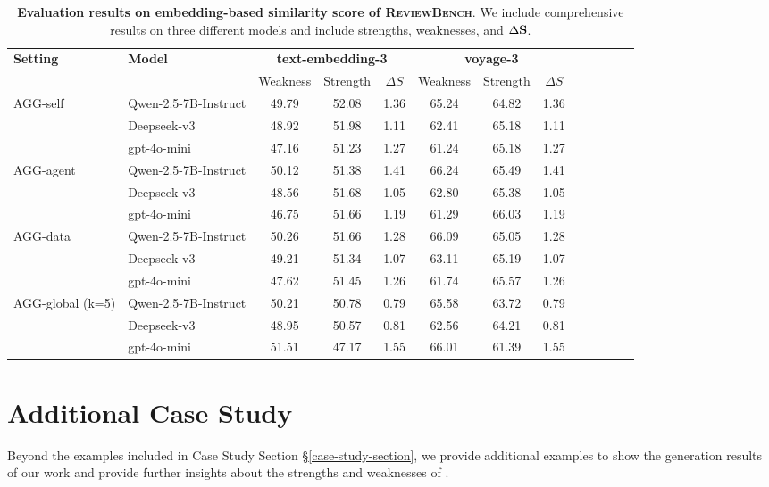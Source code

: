 \begin{table*}[htbp]
\centering
\footnotesize
\renewcommand{\arraystretch}{1.3}
\setlength{\tabcolsep}{3pt}
\caption{\textbf{Evaluation results on embedding-based similarity score of \textsc{ReviewBench}}. We include comprehensive results on three different models and include strengths, weaknesses, and $\Delta \mathbf{S}$.}
\begin{tabular}{llccccccccccc}
\toprule
\multirow{2}{*}{\textbf{Setting}} & \multirow{2}{*}{\textbf{Model}} 
& \multicolumn{3}{c}{\textbf{text-embedding-3}} & \multicolumn{3}{c}{\textbf{voyage-3}} \\
\cmidrule(lr){3-5} \cmidrule(lr){6-8}
 & & Weakness & Strength & $\Delta S$ & Weakness & Strength & $\Delta S$ \\
\midrule
\multirow{3}{*}{AGG-self}
  & Qwen-2.5-7B-Instruct & 49.79 & 52.08 & 1.36 & 65.24 & 64.82 & 1.36 \\
  & Deepseek-v3          & 48.92 & 51.98 & 1.11 & 62.41 & 65.18 & 1.11 \\
  & gpt-4o-mini          & 47.16 & 51.23 & 1.27 & 61.24 & 65.18 & 1.27 \\
\midrule
\multirow{3}{*}{AGG-agent}
  & Qwen-2.5-7B-Instruct & 50.12 & 51.38 & 1.41 & 66.24 & 65.49 & 1.41 \\
  & Deepseek-v3          & 48.56 & 51.68 & 1.05 & 62.80 & 65.38 & 1.05 \\
  & gpt-4o-mini          & 46.75 & 51.66 & 1.19 & 61.29 & 66.03 & 1.19 \\
\midrule
\multirow{3}{*}{AGG-data}
  & Qwen-2.5-7B-Instruct & 50.26 & 51.66 & 1.28 & 66.09 & 65.05 & 1.28 \\
  & Deepseek-v3          & 49.21 & 51.34 & 1.07 & 63.11 & 65.19 & 1.07 \\
  & gpt-4o-mini          & 47.62 & 51.45 & 1.26 & 61.74 & 65.57 & 1.26 \\
\midrule
\multirow{3}{*}{AGG-global (k=5)}
  & Qwen-2.5-7B-Instruct & 50.21 & 50.78 & 0.79 & 65.58 & 63.72 & 0.79 \\
  & Deepseek-v3          & 48.95 & 50.57 & 0.81 & 62.56 & 64.21 & 0.81 \\
  & gpt-4o-mini          & 51.51 & 47.17 & 1.55 & 66.01 & 61.39 & 1.55 \\
\bottomrule
\end{tabular}
\label{tab:review-writing-result-appendix}
\end{table*}



\section{Additional Case Study}
\label{additional-case-study}
Beyond the examples included in Case Study Section \S\ref{case-study-section}, we provide additional examples to show the generation results of our work and provide further insights about the strengths and weaknesses of \envname.

